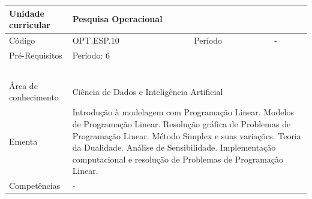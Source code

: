 \clearpage
\newpage

\begin{quadro}[ht!]
  \centering\scriptsize
\caption{Unidade Curricular Pesquisa Operacional}

\begin{tabular}{|p{2.5cm}|p{2.5cm}|p{2.5cm}|p{2.5cm}|p{2.5cm}|}\hline

  Unidade curricular & \multicolumn{4}{p{10cm}|}{ Pesquisa Operacional }\\\hline
  Código & OPT.ESP.10 & Período & \multicolumn{2}{p{5cm}|}{ - }\\\hline
  Pré-Requisitos & \multicolumn{4}{p{10cm}|}{ Período: 6 } \\\hline
  \cellcolor{blue1}{ CH PRESENCIAL } &
    \cellcolor{blue1}{CH EAD Síncrona} &
    \cellcolor{blue1}{CH EAD Síncrona Mediada} &
    \cellcolor{blue1}{CH EAD Assíncrona} &
    \cellcolor{blue1}{CH APCC} \\\hline
  \cellcolor{blue1}{ 60 } &
    \cellcolor{blue1}{ 0 } &
    \cellcolor{blue1}{ 30 } &
    \cellcolor{blue1}{ 30 } &
    \cellcolor{blue1}{0} \\\hline
  \cellcolor{blue1}{ CH Teórica } &
    \cellcolor{blue1}{CH Prática} &
    \cellcolor{blue1}{CH Humanidades} &
    \cellcolor{blue1}{CH Extensão} &
    \cellcolor{blue1}{CH EAD TOTAL} \\\hline
  \cellcolor{blue1}{ 30 } &
    \cellcolor{blue1}{ 30 } &
    \cellcolor{blue1}{ 0 } &
    \cellcolor{blue1}{ 0 } &
    \cellcolor{blue1}{ 60 } \\\hline
  \cellcolor{blue1}{CARGA-HORÁRIA TOTAL} & \multicolumn{4}{p{10cm}|}{ \cellcolor{blue1}{ 60 } } \\\hline
  Área de conhecimento & \multicolumn{4}{p{10cm}|}{ Ciência de Dados e Inteligência Artificial } \\\hline
  Ementa & \multicolumn{4}{p{10cm}|}{ Introdução à modelagem com Programação Linear. Modelos de Programação Linear. Resolução gráfica de Problemas de Programação Linear. Método Simplex e suas variações. Teoria da Dualidade. Análise de Sensibilidade. Implementação computacional e resolução de Problemas de Programação Linear. } \\\hline
  Competências & \multicolumn{4}{p{10cm}|}{ - } \\\hline


  
	\end{tabular}

\end{quadro}



